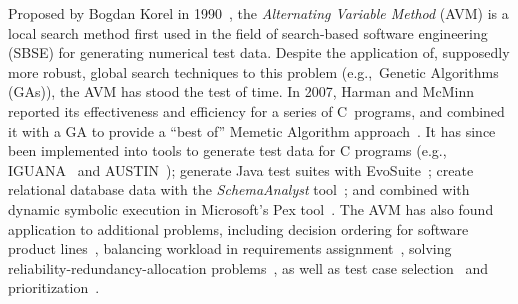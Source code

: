 \documentclass{llncs}
\newcommand{\AVM}{Alternating Variable Method\xspace}
\begin{document}
\begin{sloppypar}
  Proposed by Bogdan Korel in 1990~\cite{Korel1990}, the {\it \AVM\/} (AVM) is a local search method first used in the field of search-based software engineering (SBSE)
for generating \mbox{numerical} %
test data.
Despite the \mbox{application} of, supposedly more robust, global search techniques to this \mbox{problem} (e.g.,~\mbox{Genetic} Algorithms (GAs)),
the AVM has stood the test of time. In 2007, Harman and McMinn~\cite{Harman2007} reported its effectiveness and
efficiency for a series of C~\mbox{programs}, and combined it with a GA to provide a ``best of'' Memetic \mbox{Algorithm}
\mbox{approach}~\cite{Harman2010}. It has since been implemented into tools to generate test data for C programs (e.g.,
IGUANA~\cite{McMinn2007} and AUSTIN~\cite{Lakhotia2010,Lakhotia2013});
generate Java test suites
with {\sc
EvoSuite}~\cite{Fraser2013,Fraser2015b}; create relational database data with the {\it SchemaAnalyst\/} tool~\cite{Kapfhammer2013,McMinn2015}; and combined with dynamic symbolic execution in Microsoft's Pex tool~\cite{Lakhotia2010b}.
The AVM has also found application to
additional problems, including
%
decision ordering for %
software product lines~\cite{Yue2016}, %
%
balancing workload in requirements assignment~\cite{Yue2014}, %
%
solving reliability-redundancy-allocation problems~\cite{Qiu2016}, %
%
as well as test case selection~\cite{Pradhan2016} and prioritization~\cite{Arrieta2016}. %
\end{sloppypar}
\end{document}
